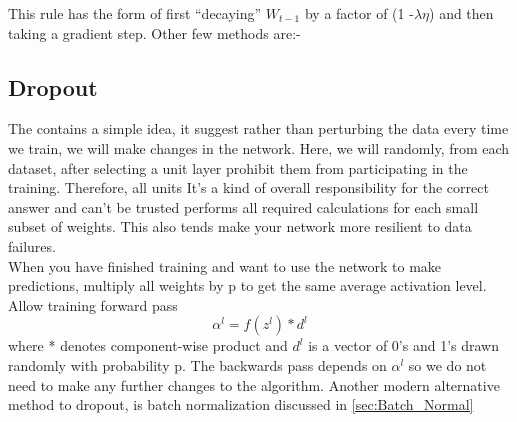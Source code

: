 This rule has the form of first “decaying” $W_{t-1}$ by a factor of (1 -$\lambda \eta$) and then taking a gradient step.
Other few methods are:-



\subsection{Dropout}
The contains a simple idea, it suggest rather than perturbing the data every time we train, we will make changes in the
network. Here, we will randomly, from each dataset, after selecting a unit layer prohibit them from participating  in the training. Therefore, all  units It's a  kind of overall responsibility for  the correct answer  and can't be trusted performs all required calculations for each small subset of weights. This also tends make your network more resilient to data failures\cite{JMLR:v15:srivastava14a}.\\
When you have finished training and want to use the network to make predictions,  multiply all weights by p to get the same average activation level. Allow training forward pass\\
\begin{equation}
    \alpha^l = f(z^l) * d^l
\end{equation}
where * denotes component-wise product and $d^l$ is a vector of 0’s and 1’s drawn randomly
with probability p. The backwards pass depends on $\alpha^l$ so we do not need to make any
further changes to the algorithm.
Another modern alternative method to dropout, is batch normalization discussed in \autoref{sec:Batch_Normal}

